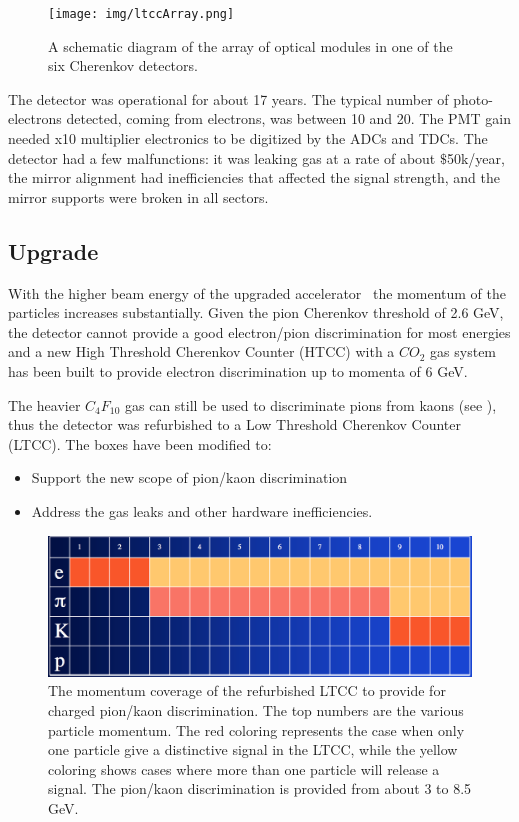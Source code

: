 \begin{figure}
	\centering
	\texttt{[image: img/ltccArray.png]}
	\caption{A schematic diagram of the array of optical modules in one of the six Cherenkov detectors.}
	\label{fig:ltccArray}
\end{figure}

The detector was operational for about 17 years. The typical number of photo-electrons detected, coming from electrons, was between 10 and 20.
The PMT gain needed x10 multiplier electronics to be digitized by the ADCs and TDCs.
The detector had a few malfunctions: it was leaking gas at a rate of about $\$$50k/year, the mirror alignment had inefficiencies that affected
the signal strength, and the mirror supports were broken in all sectors.


\subsection{Upgrade}

With the higher beam energy of the upgraded accelerator~\cite{TDR12} the momentum of the particles increases substantially.
Given the pion Cherenkov threshold of 2.6 GeV, the detector cannot provide a good electron/pion discrimination for most energies and a new
High Threshold Cherenkov Counter (HTCC) with a $CO_2$ gas system has been built to provide electron discrimination up to momenta of 6 GeV.

The heavier $C_4F_{10}$ gas can still be used to discriminate pions from kaons (see ), thus the detector was refurbished
to a Low Threshold Cherenkov Counter (LTCC).
The boxes have been modified to:

\begin{itemize}
	\item Support the new scope of pion/kaon discrimination
	\item Address the gas leaks and other hardware inefficiencies.
\end{itemize}

\begin{figure}
	\centering
	\includegraphics[width=0.95\columnwidth,keepaspectratio]{img/newScope.png}
	\caption{The momentum coverage of the refurbished LTCC to provide for charged pion/kaon discrimination. The top numbers are the various particle momentum.
				The red coloring represents the case when only one particle give a distinctive signal in the LTCC, while the yellow coloring shows cases
            where more than one particle will release a signal. The pion/kaon discrimination is provided from about 3 to 8.5 GeV.}
	\label{fig:newScope}
\end{figure}
